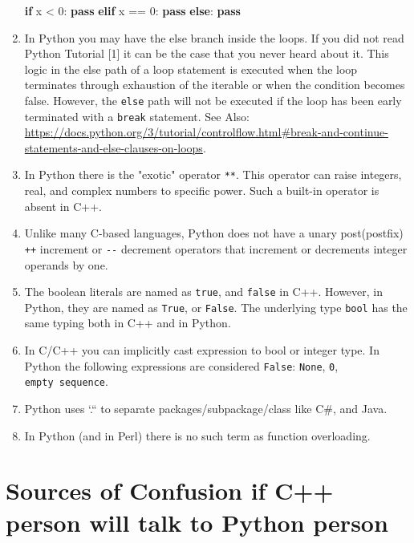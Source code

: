 \documentclass[
]{article}
\newenvironment{Shaded}{}{}
\newcommand{\ControlFlowTok}[1]{\textcolor[rgb]{0.00,0.44,0.13}{\textbf{#1}}}
\newcommand{\DecValTok}[1]{\textcolor[rgb]{0.25,0.63,0.44}{#1}}
\newcommand{\NormalTok}[1]{#1}
\newcommand{\OperatorTok}[1]{\textcolor[rgb]{0.40,0.40,0.40}{#1}}
\begin{document}
\begin{enumerate}
\begin{Shaded}
\begin{Highlighting}[]
\ControlFlowTok{if}\NormalTok{ x }\OperatorTok{\textless{}} \DecValTok{0}\NormalTok{:}
    \ControlFlowTok{pass}
\ControlFlowTok{elif}\NormalTok{ x }\OperatorTok{==} \DecValTok{0}\NormalTok{:}
    \ControlFlowTok{pass}
\ControlFlowTok{else}\NormalTok{:}
    \ControlFlowTok{pass}
\end{Highlighting}
\end{Shaded}
\item
  In Python you may have the else branch inside the loops. If you did
  not read Python Tutorial {[}1{]} it can be the case that you never
  heard about it. This logic in the else path of a loop statement is
  executed when the loop terminates through exhaustion of the iterable
  or when the condition becomes false. However, the \texttt{else} path
  will not be executed if the loop has been early terminated with a
  \texttt{break} statement. See Also:
  \url{https://docs.python.org/3/tutorial/controlflow.html\#break-and-continue-statements-and-else-clauses-on-loops}.
\item
  In Python there is the "exotic" operator \texttt{**}. This operator
  can raise integers, real, and complex numbers to specific power. Such
  a built-in operator is absent in C++.
\item
  Unlike many C-based languages, Python does not have a unary
  post(postfix) \texttt{++} increment or \texttt{-\/-} decrement
  operators that increment or decrements integer operands by one.
\item
  The boolean literals are named as \texttt{true}, and \texttt{false} in
  C++. However, in Python, they are named as \texttt{True}, or
  \texttt{False}. The underlying type \texttt{bool} has the same typing
  both in C++ and in Python.
\item
  In C/C++ you can implicitly cast expression to bool or integer type.
  In Python the following expressions are considered \texttt{False}:
  \texttt{None}, \texttt{0}, \texttt{empty\ sequence}.
\item
  Python uses `.`` to separate packages/subpackage/class like C\#, and
  Java.
\item
  In Python (and in Perl) there is no such term as function overloading.
\end{enumerate}

\hypertarget{sources-of-confusion-if-c-person-will-talk-to-python-person}{%
\section{Sources of Confusion if C++ person will talk to Python
person}\label{sources-of-confusion-if-c-person-will-talk-to-python-person}}
\end{document}
